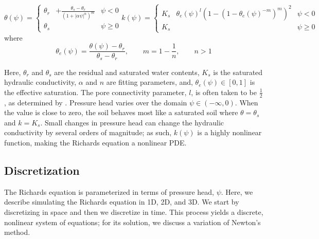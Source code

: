 \documentclass[preprint,review,3p,times,onecolumn,authoryear]{elsarticle}
\begin{document}
\begin{subequations}
\label{eq:van-genuchten}
\begin{equation}
\label{eq:van-genuchten-water-retention}
    \theta(\psi) =
    \left\{\begin{aligned}
        \theta_r& + \frac{\theta_s- \theta_r}{(1+|\alpha \psi|^n)^m}  & \psi < 0 \\
        \theta_s& & \psi \ge 0
    \end{aligned}\right.
\end{equation}
\begin{equation}
\label{eq:van-genuchten-hydraulic-conductivity}
    k(\psi) =
    \left\{\begin{aligned}
        K_s & \theta_e(\psi)^l(1-(1- \theta_e(\psi)^{-m})^m)^2 & \psi < 0 \\
        K_s& & \psi \ge 0
    \end{aligned}\right.
\end{equation}
\end{subequations}
where
\begin{equation}
\label{eq:van-genuchten-params}
    \theta_e(\psi) = \frac{\theta(\psi) - \theta_r}{\theta_s - \theta_r},
    \qquad
    m=1- \frac{1}{n},
    \qquad
    n > 1
\end{equation}

Here, $\theta_r$ and $\theta_s$ are the residual and saturated water contents, $K_s$ is the saturated hydraulic conductivity, $\alpha$ and $n$ are fitting parameters, and, $\theta_e(\psi) \in [0,1]$ is the effective saturation. The pore connectivity parameter, $l$, is often taken to be $\frac{1}{2}$, as determined by \cite{Mualem1976}. Pressure head varies over the domain $\psi \in (-\infty, 0)$. When the value is close to zero, the soil behaves most like a saturated soil where $\theta = \theta_s$ and $k = K_s$. Small changes in pressure head can change the hydraulic conductivity by several orders of magnitude; as such, $k(\psi)$ is a highly nonlinear function, making the Richards equation a nonlinear PDE.

\subsection{Discretization}
The Richards equation is parameterized in terms of pressure head, $\psi$. Here, we describe simulating the Richards equation in 1D, 2D, and 3D. We start by discretizing in space and then we discretize in time. This process yields a discrete, nonlinear system of equations; for its solution, we discuss a variation of Newton's method.
\end{document}
